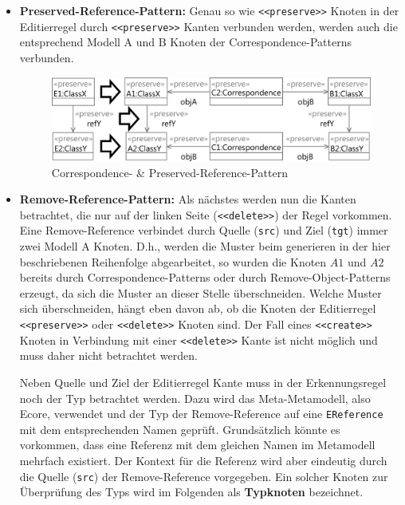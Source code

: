 \begin{itemize}
  \item \textbf{Preserved-Reference-Pattern:} Genau so wie \texttt{<<preserve>>} Knoten in der
  Editierregel durch \texttt{<<preserve>>} Kanten verbunden werden, werden auch die entsprechend
  Modell A und B Knoten der Correspondence-Patterns verbunden.
  
  \begin{figure}[htbp]
    \centering
    \includegraphics[scale=0.8]{images/pattern_correspondence.png}
    \caption{Correspondence- \& Preserved-Reference-Pattern}
    \label{fig:pattern_correspondence}
  \end{figure}
 
  \item \textbf{Remove-Reference-Pattern:} Als nächstes werden nun die Kanten betrachtet, die nur
  auf der linken Seite (\texttt{<<delete>>}) der Regel  vorkommen. Eine Remove-Reference verbindet durch
  Quelle (\texttt{src}) und Ziel (\texttt{tgt})  immer zwei Modell A Knoten. D.h., werden die Muster
  beim generieren in der hier beschriebenen Reihenfolge abgearbeitet, so wurden die Knoten $A1$ und
  $A2$ bereits durch Correspondence-Patterns oder durch Remove-Object-Patterns erzeugt, da sich die
  Muster an dieser Stelle überschneiden. Welche Muster sich überschneiden, hängt eben davon ab, ob
  die Knoten der Editierregel \texttt{<<preserve>>} oder \texttt{<<delete>>} Knoten sind. Der Fall eines
  \texttt{<<create>>} Knoten in Verbindung mit einer \texttt{<<delete>>} Kante ist nicht möglich und
  muss daher nicht betrachtet werden.
  
  Neben Quelle und Ziel der Editierregel Kante muss in der Erkennungsregel noch der Typ betrachtet
  werden. Dazu wird das Meta-Metamodell, also Ecore, verwendet und der Typ der Remove-Reference auf
  eine \texttt{EReference} mit dem entsprechenden Namen geprüft. Grundsätzlich könnte es vorkommen, dass
  eine Referenz mit dem gleichen Namen im Metamodell mehrfach existiert. Der Kontext für die
  Referenz wird aber eindeutig durch die Quelle (\texttt{src}) der Remove-Reference vorgegeben. Ein
  solcher Knoten zur Überprüfung des Typs wird im Folgenden als \textbf{Typknoten} bezeichnet.
  

\end{itemize}
